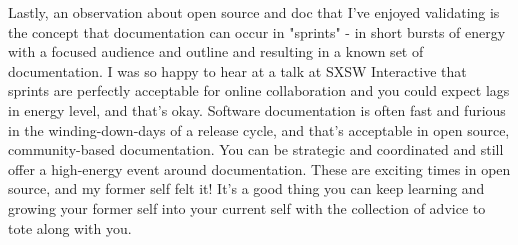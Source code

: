 Lastly, an observation about open source and doc that I've enjoyed validating is the concept that documentation can occur in "sprints" - in short bursts of energy with a focused audience and outline and resulting in a known set of documentation. I was so happy to hear at a talk at SXSW Interactive that sprints are perfectly acceptable for online collaboration and you could expect lags in energy level, and that's okay. Software documentation is often fast and furious in the winding-down-days of a release cycle, and that's acceptable in open source, community-based documentation. You can be strategic and coordinated and still offer a high-energy event around documentation. These are exciting times in open source, and my former self felt it! It's a good thing you can keep learning and growing your former self into your current self with the collection of advice to tote along with you.

